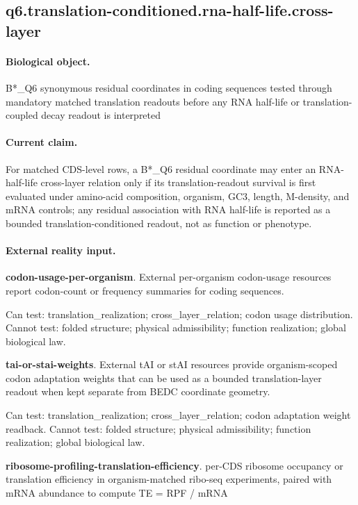 \subsection{q6.translation-conditioned.rna-half-life.cross-layer}

\paragraph{Biological object.} B*\_Q6 synonymous residual coordinates in coding sequences tested through mandatory matched translation readouts before any RNA half-life or translation-coupled decay readout is interpreted

\paragraph{Current claim.} For matched CDS-level rows, a B*\_Q6 residual coordinate may enter an RNA-half-life cross-layer relation only if its translation-readout survival is first evaluated under amino-acid composition, organism, GC3, length, M-density, and mRNA controls; any residual association with RNA half-life is reported as a bounded translation-conditioned readout, not as function or phenotype.

\paragraph{External reality input.}
\textbf{codon-usage-per-organism}. External per-organism codon-usage resources report codon-count or frequency summaries for coding sequences.

Can test: translation\_realization; cross\_layer\_relation; codon usage distribution. Cannot test: folded structure; physical admissibility; function realization; global biological law.

\textbf{tai-or-stai-weights}. External tAI or stAI resources provide organism-scoped codon adaptation weights that can be used as a bounded translation-layer readout when kept separate from BEDC coordinate geometry.

Can test: translation\_realization; cross\_layer\_relation; codon adaptation weight readback. Cannot test: folded structure; physical admissibility; function realization; global biological law.

\textbf{ribosome-profiling-translation-efficiency}. per-CDS ribosome occupancy or translation efficiency in organism-matched ribo-seq experiments, paired with mRNA abundance to compute TE = RPF / mRNA

